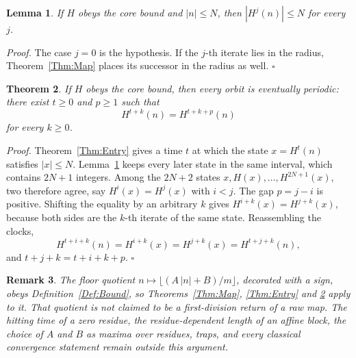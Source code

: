 \documentclass[11pt,letterpaper]{article}
\newtheorem{theorem}{Theorem}
\newtheorem{lemma}[theorem]{Lemma}
\newtheorem{remark}[theorem]{Remark}
\newenvironment{proof}{\noindent\textit{Proof.}}{\hfill\(\square\)}
\begin{document}
\begin{lemma}\label{Lem:Stays}
If \(H\) obeys the core bound and \(|n|\le N\), then
\(|H^{j}(n)|\le N\) for every \(j\).
\end{lemma}

\begin{proof}
The case \(j=0\) is the hypothesis. If the \(j\)-th iterate lies in the
radius, Theorem~\ref{Thm:Map} places its successor in the radius as well.
\end{proof}

\begin{theorem}\label{Thm:Periodic}
If \(H\) obeys the core bound, then every orbit is eventually periodic:
there exist \(t\ge0\) and \(p\ge1\) such that
\[
H^{t+k}(n)=H^{t+k+p}(n)
\]
for every \(k\ge0\).
\end{theorem}

\begin{proof}
Theorem~\ref{Thm:Entry} gives a time \(t\) at which the state
\(x=H^{t}(n)\) satisfies \(|x|\le N\). Lemma~\ref{Lem:Stays} keeps every
later state in the same interval, which contains \(2N+1\) integers. Among
the \(2N+2\) states \(x,H(x),\dots,H^{2N+1}(x)\), two therefore agree, say
\(H^{i}(x)=H^{j}(x)\) with \(i<j\). The gap \(p=j-i\) is positive. Shifting
the equality by an arbitrary \(k\) gives
\(H^{i+k}(x)=H^{j+k}(x)\), because both sides are the \(k\)-th iterate of
the same state. Reassembling the clocks,
\[
H^{t+i+k}(n)=H^{i+k}(x)=H^{j+k}(x)=H^{t+j+k}(n),
\]
and \(t+j+k=t+i+k+p\).
\end{proof}

\begin{remark}\label{Rem:Scope}
The floor quotient \(n\mapsto\lfloor(A\,|n|+B)/m\rfloor\), decorated with a
sign, obeys Definition~\ref{Def:Bound}, so Theorems~\ref{Thm:Map},
\ref{Thm:Entry} and \ref{Thm:Periodic} apply to it. That quotient is not
claimed to be a first-division return of a raw map. The hitting time of a
zero residue, the residue-dependent length of an affine block, the choice of
\(A\) and \(B\) as maxima over residues, traps, and every classical
convergence statement remain outside this argument.
\end{remark}
\end{document}
